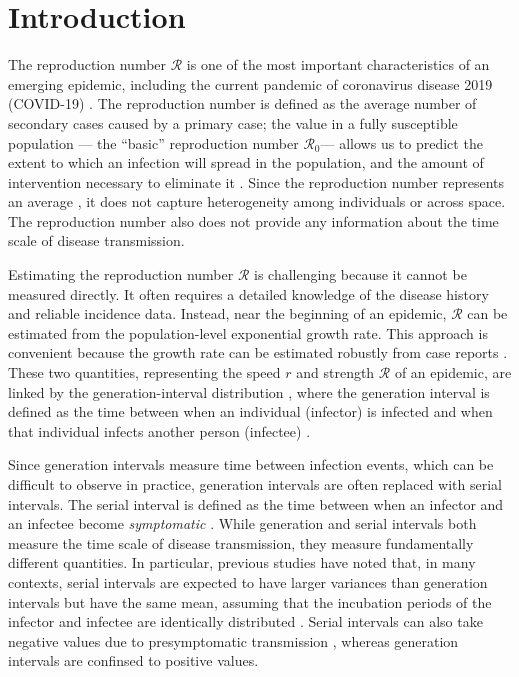 \documentclass[12pt]{article}
\newcommand{\Rx}[1]{\ensuremath{{\mathcal R}_{#1}}\xspace}
\newcommand{\Ro}{\Rx{0}}
\newcommand{\RR}{\ensuremath{{\mathcal R}}\xspace}
\begin{document}
\pagebreak

\section{Introduction}

The reproduction number \RR is one of the most important characteristics of an emerging epidemic, including the current pandemic of coronavirus disease 2019 (COVID-19) \citep{majumder2020early}.
The reproduction number is defined as the average number of secondary cases caused by a primary case;
the value in a fully susceptible population --- the ``basic'' reproduction number \Ro --- allows us to predict the extent to which an infection will spread in the population, and the amount of intervention necessary to eliminate it \citep{anderson1991infectious}.
Since the reproduction number represents an average \citep{diekmann1990definition, anderson1991infectious}, it does not capture heterogeneity among individuals or across space.
The reproduction number also does not provide any information about the time scale of disease transmission.

Estimating the reproduction number \RR is challenging because it cannot be measured directly.
It often requires a detailed knowledge of the disease history and reliable incidence data.
Instead, near the beginning of an epidemic, \RR can be estimated from the population-level exponential growth rate.
This approach is convenient because the growth rate can be estimated robustly from case reports \citep{mills2004transmissibility, ma2014estimating}.
These two quantities, representing the speed $r$ and strength $\RR$ of an epidemic, are linked by the generation-interval distribution \cite{wallinga2007generation}, where the generation interval is defined as the time between when an individual (infector) is infected and when that individual infects another person (infectee) \citep{svensson2007note}.

Since generation intervals measure time between infection events, which can be difficult to observe in practice, generation intervals are often replaced with serial intervals.
The serial interval is defined as the time between when an infector and an infectee become \emph{symptomatic} \citep{svensson2007note}.
While generation and serial intervals both measure the time scale of disease transmission, they measure fundamentally different quantities. 
In particular, previous studies have noted that, in many contexts, serial intervals are expected to have larger variances than generation intervals but have the same mean, assuming that the incubation periods of the infector and infectee are identically distributed \citep{svensson2007note,klinkenberg2011correlation,te2013estimating,champredon2018equivalence}.
Serial intervals can also take negative values due to presymptomatic transmission \citep{he2020temporal}, whereas generation intervals are confinsed to positive values.
\end{document}
